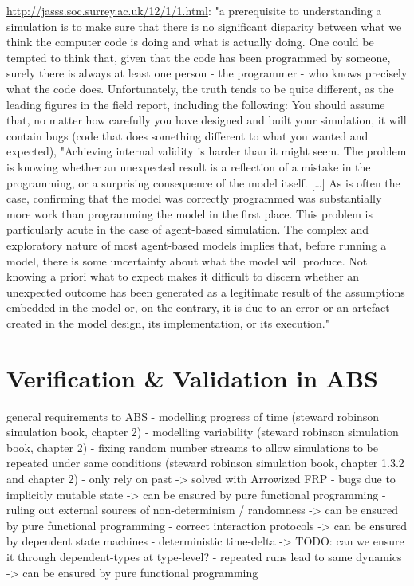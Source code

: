 \url{http://jasss.soc.surrey.ac.uk/12/1/1.html}: "a prerequisite to understanding a simulation is to make sure that there is no significant disparity between what we think the computer code is doing and what is actually doing. One could be tempted to think that, given that the code has been programmed by someone, surely there is always at least one person - the programmer - who knows precisely what the code does. Unfortunately, the truth tends to be quite different, as the leading figures in the field report, including the following: You should assume that, no matter how carefully you have designed and built your simulation, it will contain bugs (code that does something different to what you wanted and expected), "Achieving internal validity is harder than it might seem. The problem is knowing whether an unexpected result is a reflection of a mistake in the programming, or a surprising consequence of the model itself. […] As is often the case, confirming that the model was correctly programmed was substantially more work than programming the model in the first place. This problem is particularly acute in the case of agent-based simulation. The complex and exploratory nature of most agent-based models implies that, before running a model, there is some uncertainty about what the model will produce. Not knowing a priori what to expect makes it difficult to discern whether an unexpected outcome has been generated as a legitimate result of the assumptions embedded in the model or, on the contrary, it is due to an error or an artefact created in the model design, its implementation, or its execution."

\section{Verification \& Validation in ABS}
general requirements to ABS
- modelling progress of time (steward robinson simulation book, chapter 2)
- modelling variability (steward robinson simulation book, chapter 2)
- fixing random number streams to allow simulations to be repeated under same conditions (steward robinson simulation book, chapter 1.3.2 and chapter 2)
- only rely on past
	-> solved with Arrowized FRP
- bugs due to implicitly mutable state
	-> can be ensured by pure functional programming
- ruling out external sources of non-determinism / randomness
	-> can be ensured by pure functional programming
- correct interaction protocols
	-> can be ensured by dependent state machines
- deterministic time-delta
	-> TODO: can we ensure it through dependent-types at type-level?
- repeated runs lead to same dynamics
	-> can be ensured by pure functional programming
	
